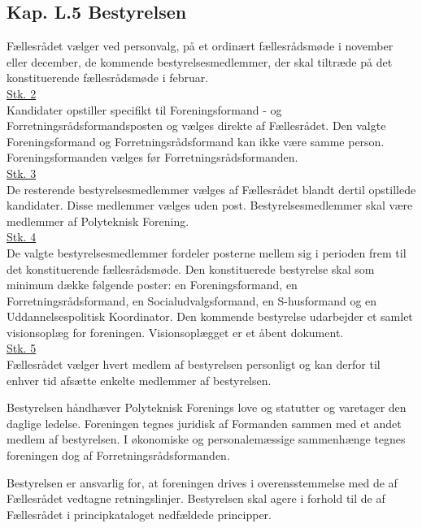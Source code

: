 \subsection*{Kap. L.5 Bestyrelsen}
\label{L:kap:bestyrelsen}
\item \label{L:best:valg} Fællesrådet vælger ved personvalg, på et ordinært fællesrådsmøde i november eller december, de kommende bestyrelsesmedlemmer, der skal tiltræde på det konstituerende fællesrådsmøde i februar.\\

\underline{Stk. 2}\\
Kandidater opstiller specifikt til Foreningsformand - og Forretningsrådsformandsposten og vælges direkte af Fællesrådet. Den valgte Foreningsformand og Forretningsrådsformand kan ikke være samme person. Foreningsformanden vælges før Forretningsrådsformanden.\\

\underline{Stk. 3}\\
De resterende bestyrelsesmedlemmer vælges af Fællesrådet blandt dertil opstillede kandidater. Disse medlemmer vælges uden post. Bestyrelsesmedlemmer skal være medlemmer af Polyteknisk Forening.\\

\underline{Stk. 4}\\
De valgte bestyrelsesmedlemmer fordeler posterne mellem sig i perioden frem til det konstituerende fællesrådsmøde. Den konstituerede bestyrelse skal som minimum dække følgende poster: en Foreningsformand, en Forretningsrådsformand, en Socialudvalgsformand, en S-husformand og en Uddannelsespolitisk Koordinator. Den kommende bestyrelse udarbejder et samlet visionsoplæg for foreningen. Visionsoplægget er et åbent dokument.\\

\underline{Stk. 5}\\ 
Fællesrådet vælger hvert medlem af bestyrelsen personligt og kan derfor til enhver tid afsætte enkelte medlemmer af bestyrelsen.\\

\item Bestyrelsen håndhæver Polyteknisk Forenings love og statutter og varetager den daglige ledelse. Foreningen tegnes juridisk af Formanden sammen med et andet medlem af bestyrelsen. I økonomiske og personalemæssige sammenhænge tegnes foreningen dog af Forretningsrådsformanden.\\

\item Bestyrelsen er ansvarlig for, at foreningen drives i overensstemmelse med de af Fællesrådet vedtagne retningslinjer. Bestyrelsen skal agere i forhold til de af Fællesrådet i principkataloget nedfældede principper.\\

